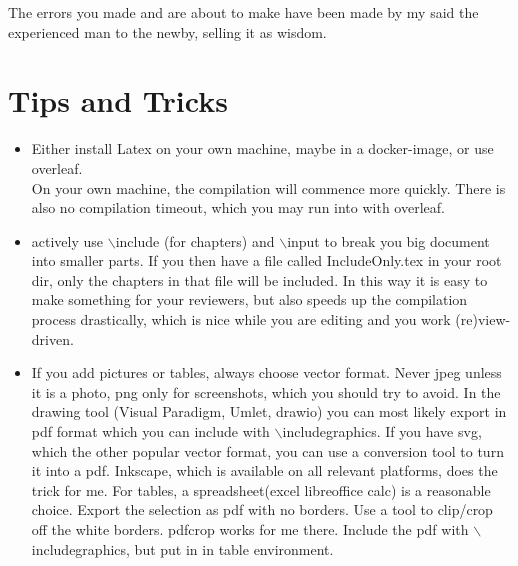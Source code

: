 \begin{savequote}[15cm]
  \raggedleft
\sffamily
The errors you made and are about to make have been made by my said the experienced man to the newby, selling it as wisdom.
\end{savequote}

\chapter{Tips and Tricks}

\begin{itemize}
\item Either install Latex on your own machine, maybe in a docker-image, or use overleaf. \\
    On your own machine, the compilation will commence more quickly. There is also no compilation timeout, which you may run into with overleaf.
\item actively use $\backslash$include (for chapters) and $\backslash$input to break you 
 big document into smaller parts. If you then have a file called IncludeOnly.tex in your root dir, only the chapters in that file will be included. In this way it is easy to make something for your reviewers, but also speeds up the compilation process drastically, which is nice while you are editing and you work (re)view-driven.
\item If you add pictures or tables, always choose vector format. Never jpeg unless it is a photo, png only for screenshots, which you should try to avoid. In the drawing tool (Visual Paradigm, Umlet, drawio)  you can most likely export in pdf format which you can include with $\backslash$includegraphics. If you have svg, which the other popular vector format, you can use a conversion tool to turn it into a pdf. Inkscape, which is available on all relevant platforms, does the trick for me.
  For tables, a spreadsheet(excel libreoffice calc) is a reasonable choice. Export the selection as pdf with no borders.  Use a tool to clip/crop off the white borders. pdfcrop works for me there. Include the pdf with $\backslash$includegraphics, but put in in table environment.
  
\end{itemize}
